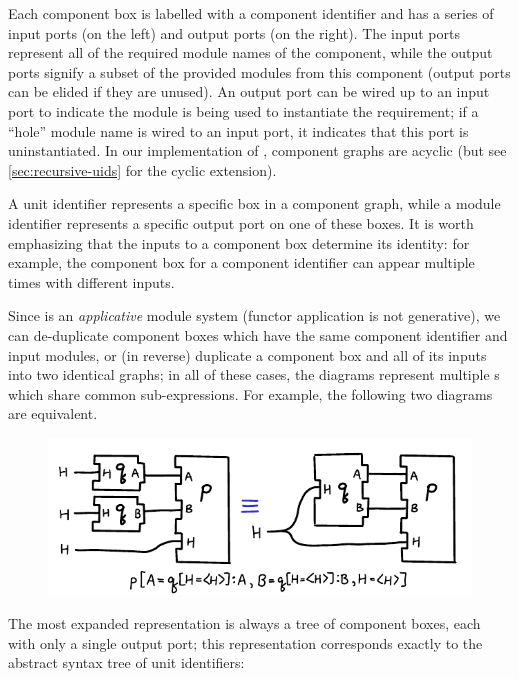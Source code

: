 \noindent
Each component box is labelled with a component identifier and has a
series of input ports (on the left) and output ports (on the right). The
input ports represent all of the required module names of the component,
while the output ports signify a subset of the provided modules from
this component (output ports can be elided if they are unused). An
output port can be wired up to an input port to indicate the module is
being used to instantiate the requirement; if a ``hole'' module name is
wired to an input port, it indicates that this port is uninstantiated.
In our implementation of \Backpack{}, component graphs are acyclic
(but see \cref{sec:recursive-uids} for the cyclic extension).

A unit identifier represents a specific box in a component graph, while
a module identifier represents a specific output port on one of these
boxes. It is worth emphasizing that the inputs to a component box
determine its identity: for example, the component box for a component
identifier can appear multiple times with different inputs.

Since \Backpack{} is an \emph{applicative} module system (functor
application is not generative), we can de-duplicate component boxes which
have the same component identifier and input modules, or (in reverse)
duplicate a component box and all of its inputs into two identical
graphs; in all of these cases, the diagrams represent multiple \uid{}s
which share common sub-expressions.  For example, the following
two diagrams are equivalent.

\begin{figure}[H]
\center\includegraphics{figures/unit-identifier-pictorial-equivalence-example-2.pdf}
\end{figure}

The most expanded representation is always a tree of component boxes, each
with only a single output port; this representation corresponds exactly
to the abstract syntax tree of unit identifiers:

